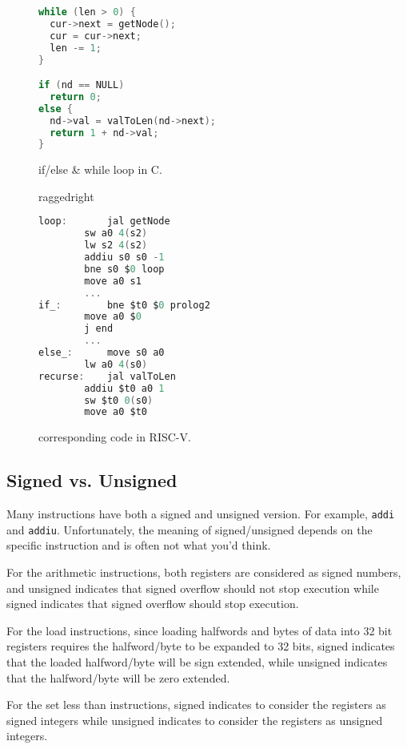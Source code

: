 \documentclass{article}
\begin{document}
\begin{figure}
\centering
\begin{minipage}{0.4\textwidth}
\renewcommand{\ttdefault}{pcr}
\begin{lstlisting}[language=C, basicstyle=\ttfamily]
while (len > 0) {
  cur->next = getNode();
  cur = cur->next;
  len -= 1;
}

if (nd == NULL)
  return 0;
else {
  nd->val = valToLen(nd->next);
  return 1 + nd->val;
}
\end{lstlisting}
\caption{if/else \& while loop in C.}
\vfill
\end{minipage}\hfill
%
\begin{minipage}{0.4\textwidth}
raggedright
\renewcommand{\ttdefault}{pcr}
\begin{lstlisting}[language=C, basicstyle=\ttfamily, keywordstyle=\bfseries, showstringspaces=false, morekeywords={jal, addu, move, bne, j, sw, addiu, lw, jr}]
loop:		jal getNode
		sw a0 4(s2)
		lw s2 4(s2)
		addiu s0 s0 -1
		bne s0 $0 loop
		move a0 s1
		...
if_:		bne $t0 $0 prolog2
		move a0 $0
		j end
		...
else_:		move s0 a0
		lw a0 4(s0)
recurse:	jal valToLen
		addiu $t0 a0 1
		sw $t0 0(s0)
		move a0 $t0		
\end{lstlisting}
\caption{corresponding code in RISC-V.}
\end{minipage}
%

\end{figure}

\subsection{Signed vs. Unsigned}
Many instructions have both a signed and unsigned version. For example, \texttt{addi} and \texttt{addiu}. Unfortunately, the meaning of signed/unsigned depends on the specific instruction and is often not what you'd think. 

For the arithmetic instructions, both registers are considered as signed numbers, and unsigned indicates that signed overflow should not stop execution while signed indicates that signed overflow should stop execution. 

For the load instructions, since loading halfwords and bytes of data into 32 bit registers requires the halfword/byte to be expanded to 32 bits, signed indicates that the loaded halfword/byte will be sign extended, while unsigned indicates that the halfword/byte will be zero extended. 

For the set less than instructions, signed indicates to consider the registers as signed integers while unsigned indicates to consider the registers as unsigned integers.
\end{document}
